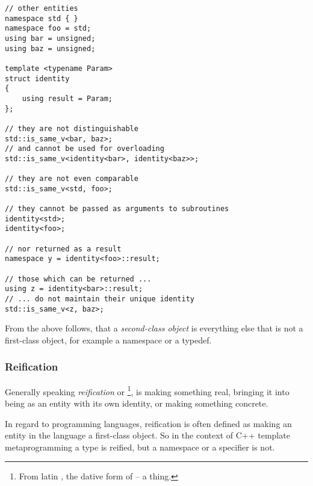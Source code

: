 \begin{verbatim}
// other entities
namespace std { }
namespace foo = std;
using bar = unsigned;
using baz = unsigned;

template <typename Param>
struct identity
{
	using result = Param;
};

// they are not distinguishable
std::is_same_v<bar, baz>;
// and cannot be used for overloading
std::is_same_v<identity<bar>, identity<baz>>;

// they are not even comparable
std::is_same_v<std, foo>;

// they cannot be passed as arguments to subroutines
identity<std>;
identity<foo>;

// nor returned as a result
namespace y = identity<foo>::result;

// those which can be returned ...
using z = identity<bar>::result;
// ... do not maintain their unique identity
std::is_same_v<z, baz>;
\end{verbatim}

From the above follows, that a {\em second-class object} is everything else that
is not a first-class object, for example a namespace or a typedef.

\subsubsection{Reification}
\label{term-reification}

Generally speaking {\em reification} or \footnote{From latin
, the dative form of  -- a thing.}, is making something
real, bringing it into being as an entity with its own identity,
or making something concrete.

In regard to programming languages, reification is often defined as making
an entity in the language a first-class object. So in the context of C++ template
metaprogramming a type is reified, but a namespace or a specifier is not.


